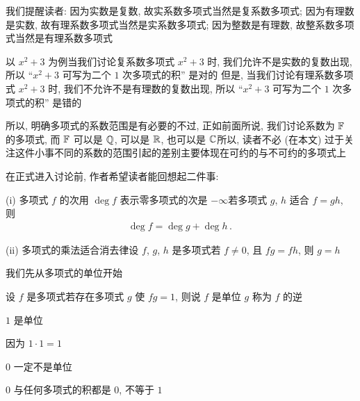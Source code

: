 \begin{remark}
    我们提醒读者: 因为实数是复数, 故实系数多项式当然是复系数多项式; 因为有理数是实数, 故有理系数多项式当然是实系数多项式; 因为整数是有理数, 故整系数多项式当然是有理系数多项式\period

    以 $x^2 + 3$ 为例\period 当我们讨论复系数多项式 $x^2 + 3$ 时, 我们允许不是实数的复数出现, 所以 ``$x^2 + 3$ 可写为二个 $1$ 次多项式的积'' 是对的 但是, 当我们讨论有理系数多项式 $x^2 + 3$ 时, 我们不允许不是有理数的复数出现, 所以 ``$x^2 + 3$ 可写为二个 $1$ 次多项式的积'' 是错的\period

    所以, 明确多项式的系数范围是有必要的\period 不过, 正如前面所说, 我们讨论系数为 $\mathbb{F}$ 的多项式, 而 $\mathbb{F}$ 可以是 $\mathbb{Q}$, 可以是 $\mathbb{R}$, 也可以是 $\mathbb{C}$\period 所以, 读者不必 (在本文) 过于关注这件小事\period 不同的系数的范围引起的差别主要体现在可约的与不可约的多项式上\period
\end{remark}

在正式进入讨论前, 作者希望读者能回想起二件事:

(i) 多项式 $f$ 的次用 $\deg f$ 表示\period 零多项式的次是 $-\infty$\period 若多项式 $g$, $h$ 适合 $f = gh$, 则
\begin{align*}
    \deg f = \deg g + \deg h \period
\end{align*}

(ii) 多项式的乘法适合消去律\period 设 $f$, $g$, $h$ 是多项式\period 若 $f \neq 0$, 且 $fg = fh$, 则 $g = h$\period

我们先从多项式的单位开始\period

\begin{definition}
    设 $f$ 是多项式\period 若存在多项式 $g$ 使 $fg = 1$, 则说 $f$ 是单位 \period $g$ 称为 $f$ 的逆 \period
\end{definition}

\begin{proposition}
    $1$ 是单位\period
\end{proposition}

\begin{pf}
    因为 $1 \cdot 1 = 1$\period
\end{pf}

\begin{proposition}
    $0$ 一定不是单位\period
\end{proposition}

\begin{pf}
    $0$ 与任何多项式的积都是 $0$, 不等于 $1$\period
\end{pf}

